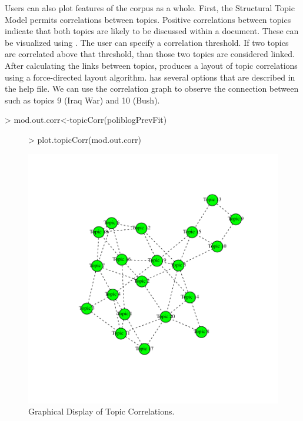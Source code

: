 \documentclass[nojss]{jss}
\begin{document}
Users can also plot features of the corpus as a whole. First, the Structural Topic Model permits correlations between topics. Positive correlations between topics indicate that both topics are likely to be discussed within a document. These can be visualized using . The user can specify a correlation threshold.  If two topics are correlated above that threshold, than those two topics are considered linked.  After calculating the links between topics,  produces a layout of topic correlations using a force-directed layout algorithm.  has several options that are described in the help file. We can use the correlation graph to observe the connection between such as topics 9 (Iraq War) and 10 (Bush).

\begin{Schunk}
\begin{Sinput}
> mod.out.corr<-topicCorr(poliblogPrevFit)
\end{Sinput}
\end{Schunk}

\begin{figure}[t!]
\begin{center}
\begin{Schunk}
\begin{Sinput}
> plot.topicCorr(mod.out.corr)
\end{Sinput}
\end{Schunk}
\includegraphics{stmVignette-022}
\caption{Graphical Display of Topic Correlations.}
\label{fig:correlations}
\end{center}
\end{figure}
\end{document}
